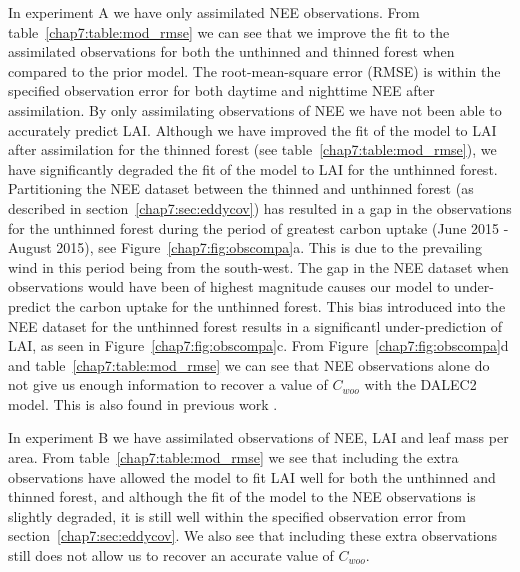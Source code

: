 In experiment A we have only assimilated NEE observations. From table~\ref{chap7:table:mod_rmse} we can see that we improve the fit to the assimilated observations for both the unthinned and thinned forest when compared to the prior model. The root-mean-square error (RMSE) is within the specified observation error for both daytime and nighttime NEE after assimilation. By only assimilating observations of NEE we have not been able to accurately predict LAI. Although we have improved the fit of the model to LAI after assimilation for the thinned forest (see table~\ref{chap7:table:mod_rmse}), we have significantly degraded the fit of the model to LAI for the unthinned forest. Partitioning the NEE dataset between the thinned and unthinned forest (as described in section~\ref{chap7:sec:eddycov}) has resulted in a gap in the observations for the unthinned forest during the period of greatest carbon uptake (June 2015 - August 2015), see Figure~\ref{chap7:fig:obscompa}a. This is due to the prevailing wind in this period being from the south-west. The gap in the NEE dataset when observations would have been of highest magnitude causes our model to under-predict the carbon uptake for the unthinned forest. This bias introduced into the NEE dataset for the unthinned forest results in a significantl under-prediction of LAI, as seen in Figure~\ref{chap7:fig:obscompa}c. From Figure~\ref{chap7:fig:obscompa}d and table~\ref{chap7:table:mod_rmse} we can see that NEE observations alone do not give us enough information to recover a value of \(C_{woo}\) with the DALEC2 model. This is also found in previous work \citep{fox2009reflex}.

In experiment B we have assimilated observations of NEE, LAI and leaf mass per area. From table~\ref{chap7:table:mod_rmse} we see that including the extra observations have allowed the model to fit LAI well for both the unthinned and thinned forest, and although the fit of the model to the NEE observations is slightly degraded, it is still well within the specified observation error from section~\ref{chap7:sec:eddycov}. We also see that including these extra observations still does not allow us to recover an accurate value of \(C_{woo}\).      

